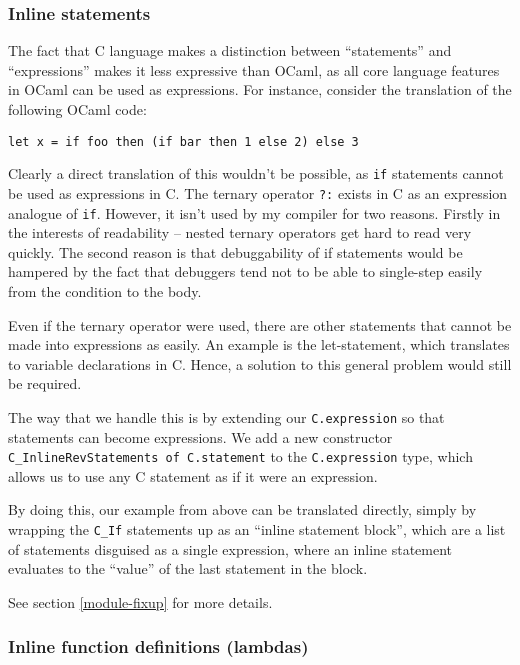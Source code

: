 \documentclass[12pt,a4paper,twoside,openright]{report}
\begin{document}
\subsubsection{Inline statements}\label{c-inline-statements}

The fact that C language makes a distinction between ``statements'' and
``expressions'' makes it less expressive than OCaml, as all core language
features in OCaml can be used as expressions. For instance, consider the
translation of the following OCaml code:

\begin{lstlisting}
let x = if foo then (if bar then 1 else 2) else 3
\end{lstlisting}

Clearly a direct translation of this wouldn't be possible, as \lstinline!if!
statements cannot be used as expressions in C. The ternary operator
\lstinline!?:! exists in C as an expression analogue of \lstinline!if!.
However, it isn't used by my compiler for two reasons.  Firstly in the
interests of readability -- nested ternary operators get hard to read very
quickly. The second reason is that debuggability of if statements would be
hampered by the fact that debuggers tend not to be able to single-step easily
from the condition to the body.

Even if the ternary operator were used, there are other statements that
cannot be made into expressions as easily. An example is the let-statement,
which translates to variable declarations in C. Hence, a solution to this
general problem would still be required.

The way that we handle this is by extending our \lstinline!C.expression! so
that statements can become expressions.  We add a new constructor
\lstinline!C_InlineRevStatements of C.statement! to the
\lstinline!C.expression! type, which allows us to use any C statement as if it
were an expression.

By doing this, our example from above can be translated directly, simply by
wrapping the \lstinline!C_If! statements up as an ``inline statement block'',
which are a list of statements disguised as a single expression, where an
inline statement evaluates to the ``value'' of the last statement in the block.

See section \ref{module-fixup} for more details.


\subsubsection{Inline function definitions (lambdas)}\label{c-inline-functions}
\end{document}
